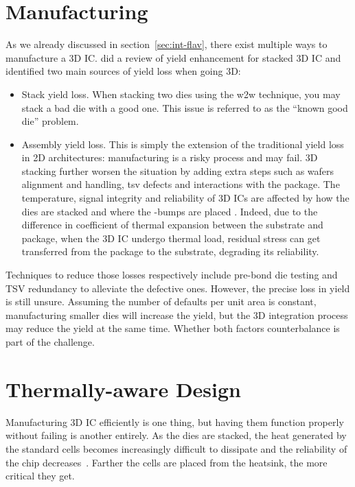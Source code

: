 \documentclass[11pt,a4paper]{report} %
\theoremstyle{customdef}
\begin{document}
\section{Manufacturing}
As we already discussed in section~\ref{sec:int-flav}, there exist multiple ways to manufacture a 3D IC.
\citet{Xu2012} did a review of yield enhancement for stacked 3D IC and identified two main sources of yield loss when going 3D:
\begin{itemize}
	\item Stack yield loss.
	When stacking two dies using the \gls{w2w} technique, you may stack a bad die with a good one.
	This issue is referred to as the “known good die” problem.

	\item Assembly yield loss.
	This is simply the extension of the traditional yield loss in 2D architectures: manufacturing is a risky process and may fail.
	3D stacking further worsen the situation by adding extra steps such as wafers alignment and handling, \gls{tsv} defects and interactions with the package.
	The temperature, signal integrity and reliability of 3D ICs are affected by how the dies are stacked and where the \textmu-bumps are placed \citep{Vempati2009,Jung2012}.
	Indeed, due to the difference in coefficient of thermal expansion between the substrate and package, when the 3D IC undergo thermal load, residual stress can get transferred from the package to the substrate, degrading its reliability.
\end{itemize}

Techniques to reduce those losses respectively include pre-bond die testing and TSV redundancy to alleviate the defective ones.
However, the precise loss in yield is still unsure.
Assuming the number of defaults per unit area is constant, manufacturing smaller dies will increase the yield, but the 3D integration process may reduce the yield at the same time.
Whether both factors counterbalance is part of the challenge.



\section{Thermally-aware Design}
Manufacturing 3D IC efficiently is one thing, but having them function properly without failing is another entirely.
As the dies are stacked, the heat generated by the standard cells becomes increasingly difficult to dissipate and the reliability of the chip decreases~\citep{Lin2008}.
Farther the cells are placed from the heatsink, the more critical they get.
\end{document}
